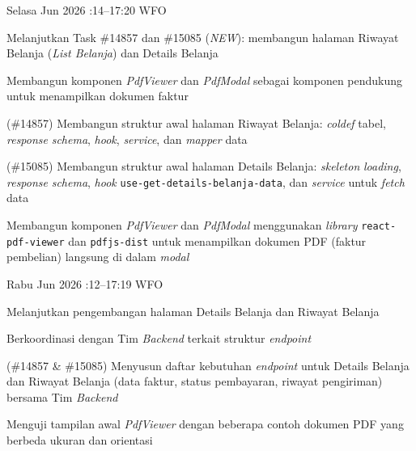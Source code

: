 \begin{logtable}
    {
        Selasa  Jun 2026 :14--17:20 \linebreak %
        WFO
    }{
        \begin{loglist}
            \item Melanjutkan Task \#14857 dan \#15085 (\textit{NEW}): membangun halaman Riwayat
            Belanja (\textit{List Belanja}) dan Details Belanja
            \item Membangun komponen \textit{PdfViewer} dan \textit{PdfModal} sebagai komponen
            pendukung untuk menampilkan dokumen faktur
        \end{loglist}
    }{
        \begin{logwork}
            \item (\#14857) Membangun struktur awal halaman Riwayat Belanja: \textit{coldef} tabel, \textit{response} \textit{schema}, \textit{hook}, \textit{service}, dan \textit{mapper} data
            \item (\#15085) Membangun struktur awal halaman Details Belanja: \textit{skeleton} \textit{loading}, \textit{response} \textit{schema}, \textit{hook} \texttt{use-get-details-belanja-data}, dan \textit{service} untuk \textit{fetch} data
            \item Membangun komponen \textit{PdfViewer} dan \textit{PdfModal} menggunakan
            \textit{library} \texttt{react-pdf-viewer} dan \texttt{pdfjs-dist} untuk
            menampilkan dokumen PDF (faktur pembelian) langsung di dalam \textit{modal}
        \end{logwork}
    }

    {
        Rabu  Jun 2026 :12--17:19 \linebreak %
        WFO
    }{
        \begin{loglist}
            \item Melanjutkan pengembangan halaman Details Belanja dan Riwayat Belanja
            \item Berkoordinasi dengan Tim \textit{Backend} terkait struktur \textit{endpoint}
        \end{loglist}
    }{
        \begin{logwork}
            \item (\#14857 \& \#15085) Menyusun daftar kebutuhan \textit{endpoint} untuk Details Belanja dan Riwayat Belanja (data faktur, status pembayaran, riwayat pengiriman) bersama Tim \textit{Backend}
            \item Menguji tampilan awal \textit{PdfViewer} dengan beberapa contoh dokumen PDF
            yang berbeda ukuran dan orientasi
        \end{logwork}
    }


\end{logtable}
